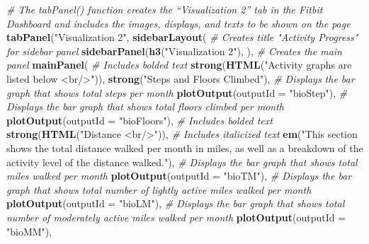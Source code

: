 \documentclass[]{book}
\newenvironment{Shaded}{\begin{snugshade}}{\end{snugshade}}
\newcommand{\KeywordTok}[1]{\textcolor[rgb]{0.13,0.29,0.53}{\textbf{#1}}}
\newcommand{\DataTypeTok}[1]{\textcolor[rgb]{0.13,0.29,0.53}{#1}}
\newcommand{\StringTok}[1]{\textcolor[rgb]{0.31,0.60,0.02}{#1}}
\newcommand{\CommentTok}[1]{\textcolor[rgb]{0.56,0.35,0.01}{\textit{#1}}}
\newcommand{\NormalTok}[1]{#1}
\begin{document}
\begin{Shaded}
\begin{Highlighting}[]
{{             \CommentTok{# The tabPanel() function creates the “Visualization 2” tab in the Fitbit Dashboard and includes the images, displays, and texts to be shown on the page}
             \KeywordTok{tabPanel}\NormalTok{(}\StringTok{"Visualization 2"}\NormalTok{,}
                      \KeywordTok{sidebarLayout}\NormalTok{(}
                        \CommentTok{# Creates title "Activity Progress" for sidebar panel}
                        \KeywordTok{sidebarPanel}\NormalTok{(}\KeywordTok{h3}\NormalTok{(}\StringTok{"Visualization 2"}\NormalTok{),}
\NormalTok{                        ),}
                        \CommentTok{# Creates the main panel}
                        \KeywordTok{mainPanel}\NormalTok{(}
                          \CommentTok{# Includes bolded text}
                          \KeywordTok{strong}\NormalTok{(}\KeywordTok{HTML}\NormalTok{(}\StringTok{"Activity graphs are listed below <br/>"}\NormalTok{)),}
                          \KeywordTok{strong}\NormalTok{(}\StringTok{"Steps and Floors Climbed"}\NormalTok{),}
                          \CommentTok{# Displays the bar graph that shows total steps per month}
                          \KeywordTok{plotOutput}\NormalTok{(}\DataTypeTok{outputId =} \StringTok{"bioStep"}\NormalTok{),}
                          \CommentTok{# Displays the bar graph that shows total floors climbed per month}
                          \KeywordTok{plotOutput}\NormalTok{(}\DataTypeTok{outputId =} \StringTok{"bioFloors"}\NormalTok{),}
                          \CommentTok{# Includes bolded text}
                          \KeywordTok{strong}\NormalTok{(}\KeywordTok{HTML}\NormalTok{(}\StringTok{"Distance <br/>"}\NormalTok{)),}
                          \CommentTok{# Includes italicized text}
                          \KeywordTok{em}\NormalTok{(}\StringTok{"This section shows the total distance walked per month in miles, as well as a breakdown of the activity level of the distance walked."}\NormalTok{),}
                          \CommentTok{# Displays the bar graph that shows total miles walked per month}
                          \KeywordTok{plotOutput}\NormalTok{(}\DataTypeTok{outputId =} \StringTok{"bioTM"}\NormalTok{),}
                          \CommentTok{# Displays the bar graph that shows total number of lightly active miles walked per month}
                          \KeywordTok{plotOutput}\NormalTok{(}\DataTypeTok{outputId =} \StringTok{"bioLM"}\NormalTok{),}
                          \CommentTok{# Displays the bar graph that shows total number of moderately active miles walked per month}
                          \KeywordTok{plotOutput}\NormalTok{(}\DataTypeTok{outputId =} \StringTok{"bioMM"}\NormalTok{),}
}}
\end{Highlighting}
\end{Shaded}
\end{document}
